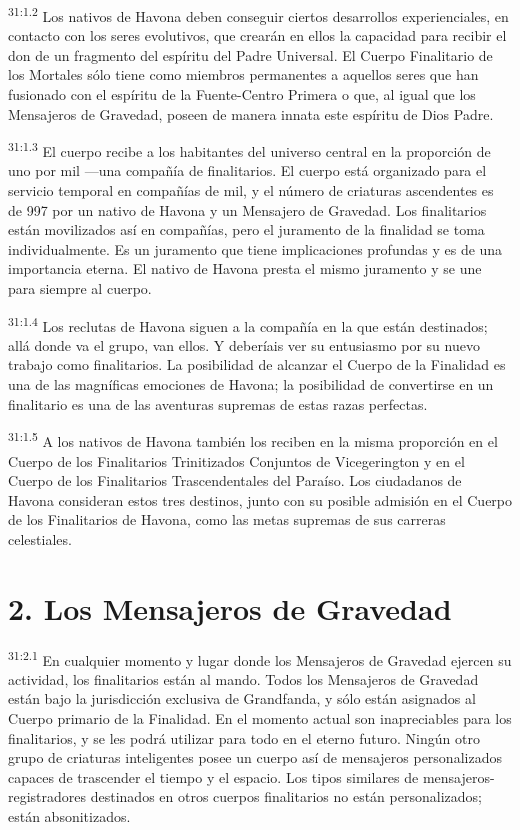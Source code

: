 \par
\textsuperscript{31:1.2} Los nativos de Havona deben conseguir ciertos desarrollos experienciales, en contacto con los seres evolutivos, que crearán en ellos la capacidad para recibir el don de un fragmento del espíritu del Padre Universal. El Cuerpo Finalitario de los Mortales sólo tiene como miembros permanentes a aquellos seres que han fusionado con el espíritu de la Fuente-Centro Primera o que, al igual que los Mensajeros de Gravedad, poseen de manera innata este espíritu de Dios Padre.

\par
\textsuperscript{31:1.3} El cuerpo recibe a los habitantes del universo central en la proporción de uno por mil ---una compañía de finalitarios. El cuerpo está organizado para el servicio temporal en compañías de mil, y el número de criaturas ascendentes es de 997 por un nativo de Havona y un Mensajero de Gravedad. Los finalitarios están movilizados así en compañías, pero el juramento de la finalidad se toma individualmente. Es un juramento que tiene implicaciones profundas y es de una importancia eterna. El nativo de Havona presta el mismo juramento y se une para siempre al cuerpo.

\par
\textsuperscript{31:1.4} Los reclutas de Havona siguen a la compañía en la que están destinados; allá donde va el grupo, van ellos. Y deberíais ver su entusiasmo por su nuevo trabajo como finalitarios. La posibilidad de alcanzar el Cuerpo de la Finalidad es una de las magníficas emociones de Havona; la posibilidad de convertirse en un finalitario es una de las aventuras supremas de estas razas perfectas.

\par
\textsuperscript{31:1.5} A los nativos de Havona también los reciben en la misma proporción en el Cuerpo de los Finalitarios Trinitizados Conjuntos de Vicegerington y en el Cuerpo de los Finalitarios Trascendentales del Paraíso. Los ciudadanos de Havona consideran estos tres destinos, junto con su posible admisión en el Cuerpo de los Finalitarios de Havona, como las metas supremas de sus carreras celestiales.

\section*{2. Los Mensajeros de Gravedad}
\par
\textsuperscript{31:2.1} En cualquier momento y lugar donde los Mensajeros de Gravedad ejercen su actividad, los finalitarios están al mando. Todos los Mensajeros de Gravedad están bajo la jurisdicción exclusiva de Grandfanda, y sólo están asignados al Cuerpo primario de la Finalidad. En el momento actual son inapreciables para los finalitarios, y se les podrá utilizar para todo en el eterno futuro. Ningún otro grupo de criaturas inteligentes posee un cuerpo así de mensajeros personalizados capaces de trascender el tiempo y el espacio. Los tipos similares de mensajeros-registradores destinados en otros cuerpos finalitarios no están personalizados; están absonitizados.

